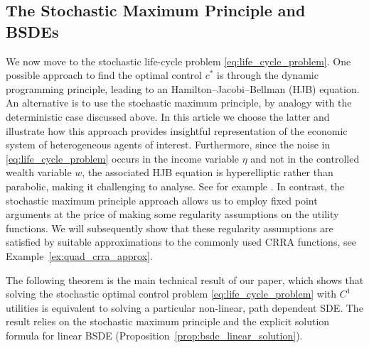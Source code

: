 \documentclass[11pt,oneside,english,reqno,dvipsnames,table]{amsart}
\numberwithin{equation}{section}
\theoremstyle{plain}
\theoremstyle{definition}
\theoremstyle{remark}
\theoremstyle{plain}
\theoremstyle{plain}
\theoremstyle{plain}
\theoremstyle{plain}
\theoremstyle{plain}
\theoremstyle{plain}
\theoremstyle{plain}
\newcommand{\cA}{\mathcal{A}}
\numberwithin{thm}{section}
\begin{document}
\subsection{The Stochastic Maximum Principle and BSDEs}

We now move to the stochastic life-cycle problem \eqref{eq:life_cycle_problem}. One possible approach to find the optimal control $c^*$ is through the dynamic programming principle, leading to an Hamilton--Jacobi--Bellman (HJB) equation. An alternative is to use the stochastic maximum principle, by analogy with the deterministic case discussed above.  In this article we choose the latter and illustrate how this approach provides insightful representation of the economic system of heterogeneous agents of interest. Furthermore, since the noise in \eqref{eq:life_cycle_problem} occurs in the income variable $\eta$ and not in the controlled wealth variable $w$, the associated HJB equation is hyperelliptic rather than parabolic, making it challenging to analyse. See for example \cite{ambrose_21_existence}. In contrast, the stochastic maximum principle approach allows us to employ fixed point arguments at the price of making some regularity assumptions on the utility functions. We will subsequently show that these regularity assumptions are satisfied by suitable approximations to the commonly used CRRA functions, see Example~\ref{ex:quad_crra_approx}.










The following theorem is the main technical result of our paper, which shows that solving the stochastic optimal control problem \eqref{eq:life_cycle_problem} with $C^1$ utilities is equivalent to solving a particular non-linear, path dependent SDE. The result relies on the stochastic maximum principle and the explicit solution formula for linear BSDE (Proposition~\ref{prop:bsde_linear_solution}).  
\end{document}
